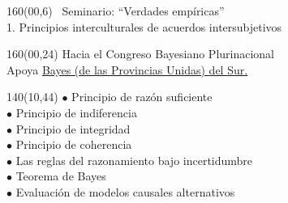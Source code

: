 \documentclass[shownotes,aspectratio=169]{beamer}
\begin{document}
%
%
%
%
%
%
%



\begin{frame}
\begin{textblock}{160}(00,6)
\centering
\LARGE \ Seminario: ``Verdades empíricas'' \\
\Large 1. Principios interculturales de acuerdos intersubjetivos
\end{textblock}

\begin{textblock}{160}(00,24) \centering
Hacia el Congreso Bayesiano Plurinacional  \\
Apoya \href{https://github.com/BayesDeLasProvinciasUnidasDelSur/curso}{Bayes (de las Provincias Unidas) del Sur.}
\end{textblock}

\begin{textblock}{140}(10,44)
\small
$\bullet$ Principio de razón suficiente \\
$\bullet$ Principio de indiferencia \\
$\bullet$ Principio de integridad \\
$\bullet$ Principio de coherencia \\
$\bullet$ Las reglas del razonamiento bajo incertidumbre \\
$\bullet$ Teorema de Bayes \\
$\bullet$ Evaluación de modelos causales alternativos \\
\end{textblock}

\end{frame}
\end{document}
